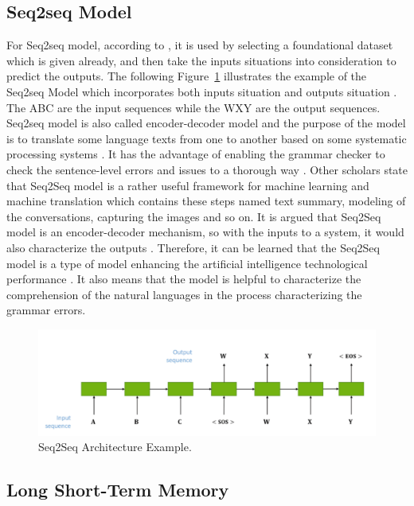 \subsection{Seq2seq Model}
For Seq2seq model, according to \cite{lu2019advances}, it is used by selecting a foundational dataset which is given already, and then take the inputs situations into consideration to predict the outputs. The following Figure~\ref{fig:2} illustrates the example of the Seq2seq Model which incorporates both inputs situation and outputs situation \cite{lu2019advances}. The ABC are the input sequences while the WXY are the output sequences. Seq2seq model is also called encoder-decoder model and the purpose of the model is to translate some language texts from one to another based on some systematic processing systems \cite{schmaltz2016sentence}. It has the advantage of enabling the grammar checker to check the sentence-level errors and issues to a thorough way \cite{schmaltz2016sentence}. 
Other scholars \cite{szuba2001computational} state that Seq2Seq model is a rather useful framework for machine learning and machine translation which contains these steps named text summary, modeling of the conversations, capturing the images and so on. It is argued that Seq2Seq model is an encoder-decoder mechanism, so with the inputs to a system, it would also characterize the outputs \cite{szuba2001computational}. Therefore, it can be learned that the Seq2Seq model is a type of model enhancing the artificial intelligence technological performance \cite{szuba2001computational}. It also means that the model is helpful to characterize the comprehension of the natural languages in the process characterizing the grammar errors. 
\begin{figure}[ht]
    \centering
    \includegraphics[width=\textwidth]{Seq2seqAE.png}
    \caption{Seq2Seq Architecture Example.}
    \label{fig:2}
\end{figure}

\subsection{Long Short-Term Memory}

